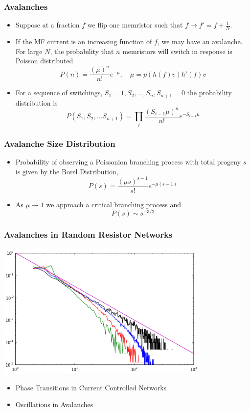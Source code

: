 \documentclass[mathserif]{beamer}
\begin{document}
\begin{frame}
\frametitle{Avalanches}
\begin{itemize}
\item Suppose at a fraction $f$ we flip one memristor such that $f\to f'= f + \frac{1}{N}$.
\item If the MF current is an increasing function of $f$, we may have an avalanche. For large
$N$, the probability that $n$ memristors will switch in response is Poisson distributed
$$P(n) = \frac{(\mu)^n}{n!} e^{-\mu}, \quad \mu = p(h(f)v)h'(f)v$$
\item For a sequence of switchings, $S_1=1, S_2, ...,S_n, S_{n+1}=0$ the
probability distribution is
$$P(S_1, S_2, ...S_{n+1}) = \prod_i  \frac{(S_{i-1}\mu)^n}{n!} e^{-S_{i-1}\mu} $$

\end{itemize}
\end{frame}

\begin{frame}
\frametitle{Avalanche Size Distribution}
\begin{itemize}
\item Probability of observing a Poissonion branching process with total progeny $s$ is given
by the Borel Distribution,
$$P(s) = \frac{(\mu s)^{s-1}}{s!} e^{-\mu(s-1)}$$
\item As $\mu\to 1$ we approach a critical branching process and
$$P(s) \sim s^{-3/2}$$
\end{itemize}
\end{frame}

\begin{frame}
\frametitle{Avalanches in Random Resistor Networks}
\includegraphics[width=0.8\textwidth]{Avalanches_p6.png}

\end{frame}

\begin{frame}
\begin{itemize}
\item Phase Transitions in Current Controlled Networks
\item Oscillations in Avalanches
\end{itemize}
\end{frame}
\end{document}
